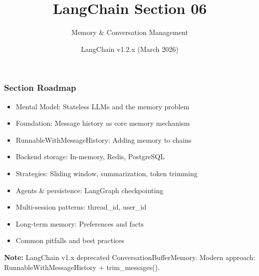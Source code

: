 \documentclass[aspectratio=169,11pt]{beamer}
\title{LangChain Section 06}
\subtitle{Memory \& Conversation Management}
\author{LangChain v1.2.x (March 2026)}
\date{}
\begin{document}
\frame{\titlepage}

\begin{frame}
  \frametitle{Section Roadmap}
  \begin{itemize}
\setlength{\itemsep}{1pt}
    \item Mental Model: Stateless LLMs and the memory problem
    \item Foundation: Message history as core memory mechanism
    \item RunnableWithMessageHistory: Adding memory to chains
    \item Backend storage: In-memory, Redis, PostgreSQL
    \item Strategies: Sliding window, summarization, token trimming
    \item Agents \& persistence: LangGraph checkpointing
    \item Multi-session patterns: thread\_id, user\_id
    \item Long-term memory: Preferences and facts
    \item Common pitfalls and best practices
  \end{itemize}
  \vspace{0.6em}
  \textcolor{lcred}{\textbf{Note:}} LangChain v1.x deprecated ConversationBufferMemory.
  Modern approach: RunnableWithMessageHistory + trim\_messages().
\end{frame}
\end{document}
